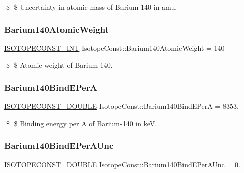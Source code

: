 \$ \$ Uncertainty in atomic mass of Barium-\/140 in amu. \mbox{\label{group___isotope_const-_barium-_ba140_ga41f72e93ad7ea71e02a7f57e1aea6527}} 
\subsubsection{\texorpdfstring{Barium140\+Atomic\+Weight}{Barium140AtomicWeight}}
{\footnotesize\ttfamily \mbox{\hyperlink{group___isotope_const-_macros_ga5f18360b3e99483a35c32d789e62621c}{I\+S\+O\+T\+O\+P\+E\+C\+O\+N\+S\+T\+\_\+\+I\+NT}} Isotope\+Const\+::\+Barium140\+Atomic\+Weight = 140}

\$ \$ Atomic weight of Barium-\/140. \mbox{\label{group___isotope_const-_barium-_ba140_ga87c7218cb840bbf09a1922362d30faef}} 
\subsubsection{\texorpdfstring{Barium140\+Bind\+E\+PerA}{Barium140BindEPerA}}
{\footnotesize\ttfamily \mbox{\hyperlink{group___isotope_const-_macros_ga8f45a7272ce02c0b4c65c44636ed719a}{I\+S\+O\+T\+O\+P\+E\+C\+O\+N\+S\+T\+\_\+\+D\+O\+U\+B\+LE}} Isotope\+Const\+::\+Barium140\+Bind\+E\+PerA = 8353.}

\$ \$ Binding energy per A of Barium-\/140 in keV. \mbox{\label{group___isotope_const-_barium-_ba140_ga1d3cfb739b3483fb092df4acb607fa25}} 
\subsubsection{\texorpdfstring{Barium140\+Bind\+E\+Per\+A\+Unc}{Barium140BindEPerAUnc}}
{\footnotesize\ttfamily \mbox{\hyperlink{group___isotope_const-_macros_ga8f45a7272ce02c0b4c65c44636ed719a}{I\+S\+O\+T\+O\+P\+E\+C\+O\+N\+S\+T\+\_\+\+D\+O\+U\+B\+LE}} Isotope\+Const\+::\+Barium140\+Bind\+E\+Per\+A\+Unc = 0.}

